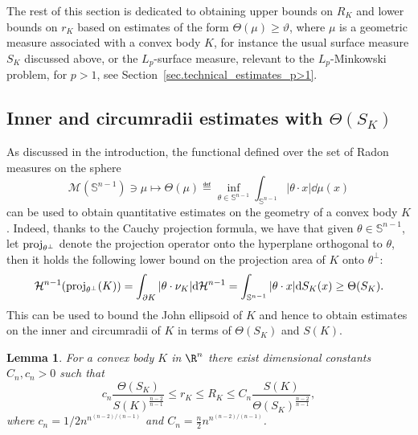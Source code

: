 \documentclass[a4paper, 10pt, twoside]{amsart}
\numberwithin{equation}{section}
\newcommand{\lemmname}{Lemma}
\theoremstyle{plain}
\newtheorem{lemma}[theorem]{\lemmname}
\theoremstyle{definition}
\begin{document}
The rest of this section is dedicated to obtaining upper bounds on $R_K$ and lower bounds on $r_K$ based on estimates of the form $\Theta(\mu) \ge \vartheta$, where $\mu$ is a geometric measure associated with a convex body $K$, for instance the usual surface measure $S_K$ discussed above, or the $L_p$-surface measure, relevant to the $L_p$-Minkowski problem, for $p>1$, see Section~\ref{sec.technical_estimates_p>1}. 

\subsection{Inner and circumradii estimates with $\Theta(S_K)$}\label{sec.technical_estimates_p=1}

As discussed in the introduction, the functional defined over the set of Radon measures on the sphere 
\[
    \mathscr{M}(\mathbb{S}^{n-1}) \ni \mu 
    \mapsto \Theta(\mu) 
    \eqdef 
    \inf_{\theta \in \mathbb{S}^{n-1}} 
    \int_{\mathbb{S}^{n-1}} 
    |\theta\cdot x|\dd \mu(x)
\]
can be used to obtain quantitative estimates on the geometry of a convex body $K$. Indeed, thanks to the Cauchy projection formula, we have that given $\theta \in \mathbb{S}^{n-1}$, let ${\mathop{\rm proj}}_{\theta^\perp}$ denote the projection operator onto the hyperplane orthogonal to $\theta$, then it holds the following lower bound on the projection area of $K$ onto $\theta^\perp$:
\begin{equation}\label{eq.projection_area_lower_bound}
    \mathcal{H}^{n-1}({\mathop{\rm proj}}_{\theta^\perp}(K)) 
    =
    \int_{\partial K} 
    |\theta\cdot \nu_K|{\rm d} \mathcal{H}^{n-1} 
    =
    \int_{\mathbb{S}^{n-1}} 
    |\theta\cdot x|{\rm d} S_K(x)
    \ge \Theta(S_K).
\end{equation}
This can be used to bound the John ellipsoid of $K$ and hence to obtain estimates on the inner and circumradii of $K$ in terms of $\Theta(S_K)$ and $S(K)$.
\begin{lemma}\label{lemma.rR}
For a convex body $K$ in $\R^n$ there exist dimensional constants $C_n,c_n > 0$ such that
\[
    c_n
    \frac{\Theta(S_K)}{{S(K)}^{\frac{n-2}{n-1}}} \le r_K \leq R_K
    \le 
    C_n 
    \frac{S(K)}{{\Theta(S_K)}^{\frac{n-2}{n-1}}},
\] 
where $c_n = 1/{2{n}^{n^{(n-2)/(n-1)}}}$ and $C_n = \frac{n}{2}{n}^{n^{(n-2)/(n-1)}}$.
\end{lemma}
\end{document}
